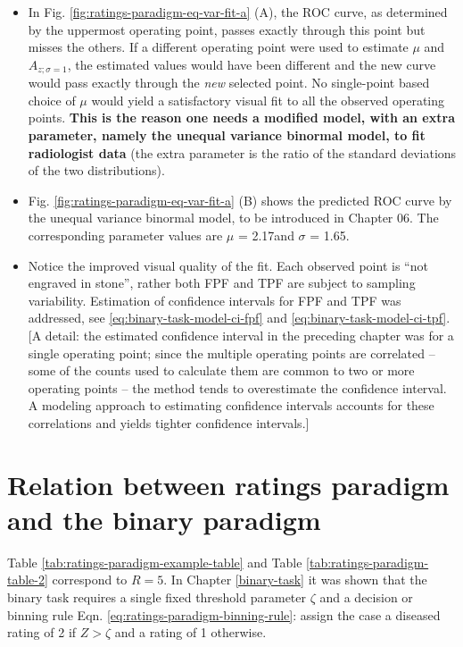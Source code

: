 \documentclass[
]{book}
\begin{document}
\begin{itemize}
\item
  In Fig. \ref{fig:ratings-paradigm-eq-var-fit-a} (A), the ROC curve, as determined by the uppermost operating point, passes exactly through this point but misses the others. If a different operating point were used to estimate \(\mu\) and \(A_{z;\sigma = 1}\), the estimated values would have been different and the new curve would pass exactly through the \emph{new} selected point. No single-point based choice of \(\mu\) would yield a satisfactory visual fit to all the observed operating points. \textbf{This is the reason one needs a modified model, with an extra parameter, namely the unequal variance binormal model, to fit radiologist data} (the extra parameter is the ratio of the standard deviations of the two distributions).
\item
  Fig. \ref{fig:ratings-paradigm-eq-var-fit-a} (B) shows the predicted ROC curve by the unequal variance binormal model, to be introduced in Chapter 06. The corresponding parameter values are \(\mu\) = 2.17and \(\sigma\) = 1.65.
\item
  Notice the improved visual quality of the fit. Each observed point is ``not engraved in stone'', rather both FPF and TPF are subject to sampling variability. Estimation of confidence intervals for FPF and TPF was addressed, see \eqref{eq:binary-task-model-ci-fpf} and \eqref{eq:binary-task-model-ci-tpf}. {[}A detail: the estimated confidence interval in the preceding chapter was for a single operating point; since the multiple operating points are correlated -- some of the counts used to calculate them are common to two or more operating points -- the method tends to overestimate the confidence interval. A modeling approach to estimating confidence intervals accounts for these correlations and yields tighter confidence intervals.{]}
\end{itemize}

\hypertarget{ratings-task-relation-binary-to-rating}{%
\section{Relation between ratings paradigm and the binary paradigm}\label{ratings-task-relation-binary-to-rating}}

Table \ref{tab:ratings-paradigm-example-table} and Table \ref{tab:ratings-paradigm-table-2} correspond to \(R = 5\). In Chapter \ref{binary-task} it was shown that the binary task requires a single fixed threshold parameter \(\zeta\) and a decision or binning rule Eqn. \eqref{eq:ratings-paradigm-binning-rule}: assign the case a diseased rating of 2 if \(Z > \zeta\) and a rating of 1 otherwise.
\end{document}
